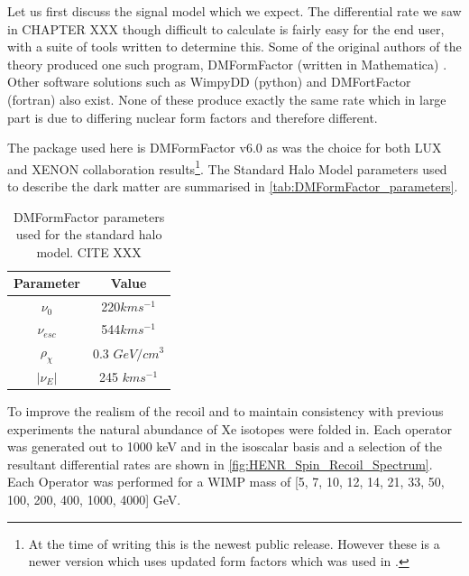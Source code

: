 




\iffalse
\par
Let us first discuss the signal model which we expect.
The differential rate we saw in CHAPTER XXX though difficult to calculate is fairly easy for the end user, with a suite of tools written to determine this.
Some of the original authors of the theory produced one such program, DMFormFactor (written in Mathematica) \cite{dmformfactor_ref}.
Other software solutions such as WimpyDD (python) and DMFortFactor (fortran) also exist.
None of these produce exactly the same rate which in large part is due to differing nuclear form factors and therefore different.

\par
The package used here is DMFormFactor v6.0 as was the choice for both LUX and XENON collaboration results\footnote{At the time of writing this is the newest public release. However these is a newer version which uses updated form factors which was used in \cite{pandax_2_eft_ref}.}.
The Standard Halo Model parameters used to describe the dark matter are summarised in \autoref{tab:DMFormFactor_parameters}.
\begin{table}[]
    \centering
    \begin{tabular}{c|c}
        Parameter         & Value  \\ \hline
        $\nu_0$           & 220$km s^{-1}$ \\
        $\nu_{esc}$       & 544$km s^{-1}$ \\
        $\rho_{\chi}$     & 0.3 $GeV/cm^{3}$ \\
        $|\nu_E|$         & 245 $km s^{-1}$ 
    \end{tabular}
    \caption{DMFormFactor parameters used for the standard halo model. CITE XXX}
    \label{tab:DMFormFactor_parameters}
\end{table}
To improve the realism of the recoil and to maintain consistency with previous experiments the natural abundance of Xe isotopes were folded in.
Each operator was generated out to 1000 keV and in the isoscalar basis and a selection of the resultant differential rates are shown in \autoref{fig:HENR_Spin_Recoil_Spectrum}.
Each Operator was performed for a WIMP mass of [5, 7, 10, 12, 14, 21, 33, 50, 100, 200, 400, 1000, 4000] GeV.









